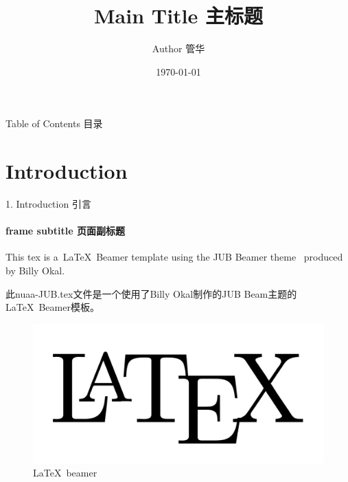 \documentclass{ctexbeamer}
\begin{document}
  \title{Main Title 主标题}
  \author{Author 管华}
  \date{\today}

  \begin{frame}[plain,t]
      \titlepage
  \end{frame} %

  \begin{frame}{Table of Contents 目录}
      \tableofcontents
  \end{frame} %

  \section{Introduction}
  \label{Sec:introduction}
  \begin{frame}{1. Introduction 引言}
      \framesubtitle{frame subtitle 页面副标题}
      This tex is a~\LaTeX\ Beamer template using the JUB Beamer theme~\cite{JUBTheme} produced by Billy Okal.

      \bigskip

      此nuaa-JUB.tex文件是一个使用了Billy Okal制作的JUB Beam主题\cite{JUBTheme}的\LaTeX \ Beamer模板。

      \begin{figure}
          \begin{center}
              \includegraphics[scale=0.1]{latex.png}
          \end{center}
          \caption{\LaTeX \ beamer}
          \label{Fig:latex_beamer}
      \end{figure}
  \end{frame} %
\end{document}
